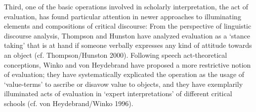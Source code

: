 Third, one of the basic operations involved in scholarly interpretation, the act of evaluation, has found particular attention in newer approaches to illuminating elements and compositions of critical discourse: From the perspective of linguistic discourse analysis, Thompson and Hunston have analyzed evaluation as a `stance taking' that is at hand if someone verbally expresses any kind of attitude towards an object (cf. Thompson/Hunston 2000). Following speech act-theoretical conceptions, Winko and von Heydebrand have proposed a more restrictive notion of evaluation; they have systematically explicated the operation as the usage of `value-terms' to ascribe or disavow value to objects, and they have exemplarily illuminated acts of evaluation in `expert interpretations' of different critical schools (cf. von Heydebrand/Winko 1996).
